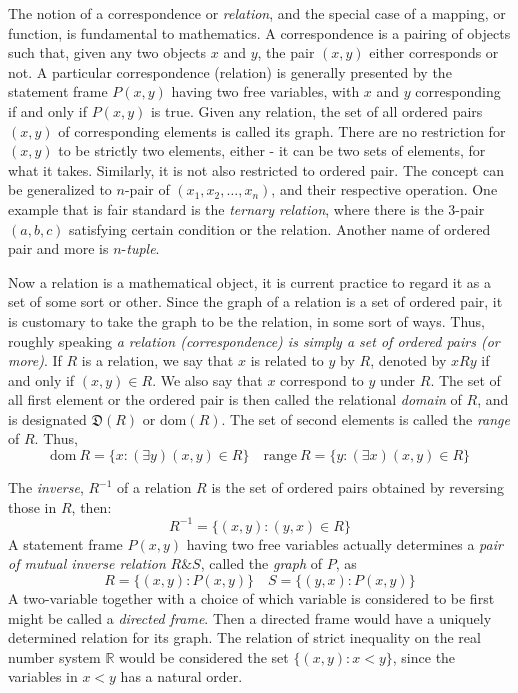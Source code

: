 The notion of a correspondence or \textit{relation}, and the special case of a mapping, or function, is fundamental to mathematics. A correspondence is a pairing of objects such that, given any two objects $x$ and $y$, the pair $(x,y)$ either corresponds or not. A particular correspondence (relation) is generally presented by the statement frame $P(x,y)$ having two free variables, with $x$ and $y$ corresponding if and only if $P(x,y)$ is true. Given any relation, the set of all ordered pairs $(x,y)$ of corresponding elements is called its graph. There are no restriction for $(x,y)$ to be strictly two elements, either - it can be two sets of elements, for what it takes. Similarly, it is not also restricted to ordered pair. The concept can be generalized to $n$-pair of $(x_1, x_2, \dots, x_n)$, and their respective operation. One example that is fair standard is the \textit{ternary relation}, where there is the 3-pair $(a,b,c)$ satisfying certain condition or the relation. Another name of ordered pair and more is $n$-\textit{tuple}. 

Now a relation is a mathematical object, it is current practice to regard it as a set of some sort or other. Since the graph of a relation is a set of ordered pair, it is customary to take the graph to be the relation, in some sort of ways. Thus, roughly speaking \textit{a relation (correspondence) is simply a set of ordered pairs (or more)}. If $R$ is a relation, we say that $x$ is related to $y$ by $R$, denoted by $xRy$ if and only if $(x,y)\in R$. We also say that $x$ correspond to $y$ under $R$. The set of all first element or the ordered pair is then called the relational \textit{domain} of $R$, and is designated $\mathfrak{D}(R)$ or $\mathrm{dom}(R)$. The set of second elements is called the \textit{range} of $R$. Thus, 
\begin{equation*}
    \mathrm{dom}\: R = \{x: (\exists y)(x,y)\in R\} \quad \mathrm{range}\: R = \{y: (\exists x) (x,y)\in R\}
\end{equation*}

The \textit{inverse}, $R^{-1}$ of a relation $R$ is the set of ordered pairs obtained by reversing those in $R$, then: 
\begin{equation*}
    R^{-1} = \{(x,y): (y,x)\in R\}
\end{equation*}
A statement frame $P(x,y)$ having two free variables actually determines a \textit{pair of mutual inverse relation} $R\& S$, called the \textit{graph} of $P$, as \begin{equation*}
    R = \{(x,y): P(x,y)\} \quad S = \{(y,x): P(x,y)\}
\end{equation*}
A two-variable together with a choice of which variable is considered to be first might be called a \textit{directed frame}. Then a directed frame would have a uniquely determined relation for its graph. The relation of strict inequality on the real number system $\mathbb{R}$ would be considered the set $\{(x,y): x < y\}$, since the variables in $x<y$ has a natural order. 


